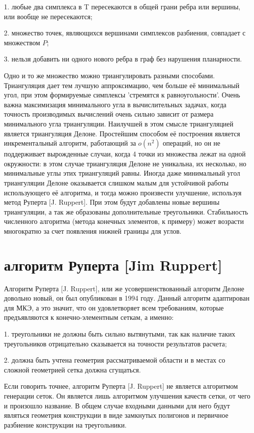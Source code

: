 \documentclass[14pt]{extreport}
\begin{document}
	1. любые два симплекса в T пересекаются в общей грани ребра или вершины, или вообще не пересекаются;

	2. множество точек, являющихся вершинами симплексов разбиения, совпадает с множеством $P$;
	
	3. нельзя добавить ни одного нового ребра в граф без нарушения планарности.

Одно и то же множество можно триангулировать разными способами. Триангуляция дает тем лучшую аппроксимацию, чем больше её минимальный угол, при этом формируемые симплексы 'стремятся к равноугольности'. Очень важна максимизация минимального угла в вычислительных задачах, когда точность производимых вычислений очень сильно зависит от размера минимального угла триангуляции. Наилучшей в этом смысле триангуляцией является триангуляция Делоне. Простейшим способом её построения является инкрементальный алгоритм, работающий за $o(n^2)$ операций, но он не поддерживает вырожденные случаи, когда 4 точки из множества лежат на одной окружности: в этом случае триангуляция Делоне не уникальна, их несколько, но минимальные углы этих триангуляций равны. Иногда даже минимальный угол триангуляции Делоне оказывается слишком малым для устойчивой работы использующего её алгоритма, и тогда можно произвести улучшение, используя метод Руперта [J. Ruppert]. При этом будут добавлены новые вершины триангуляции, а так же образованы дополнительные треугольники. Стабильность численного алгоритма (метода конечных элементов, к примеру) может возрасти многократно за счет появления нижней границы для углов. 

\section{алгоритм Руперта [Jim Ruppert]}

Алгоритм Руперта [J. Ruppert], или же усовершенствованный алгоритм Делоне довольно новый, он был опубликован в 1994 году. Данный алгоритм адаптирован для МКЭ, а это значит, что он удовлетворяет всем требованиям, которые предъявляются к конечно-элементным сеткам, а именно:

1. треугольники не должны быть сильно вытянутыми, так как наличие таких треугольников отрицательно сказывается на точности результатов расчета;

2. должна быть учтена геометрия рассматриваемой области и в местах со сложной геометрией сетка должна сгущаться.


Если говорить точнее, алгоритм Руперта [J. Ruppert] не является алгоритмом генерации сеток. Он является лишь алгоритмом улучшения качеств сетки, от чего и произошло название. В общем случае входными данными для него будут являться геометрия конструкции в виде замкнутых полигонов и первичное разбиение конструкции на треугольники. 
\end{document}
